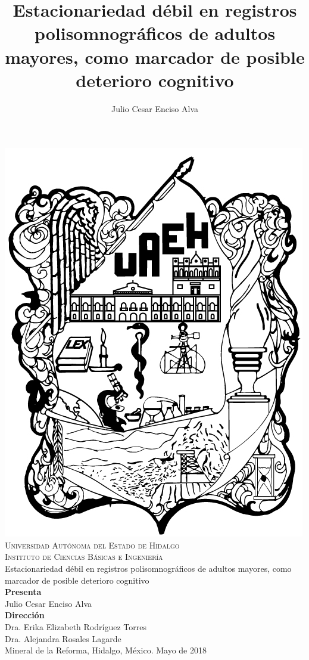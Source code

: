 \documentclass[12pt,letterpaper]{book}
\begin{document}
\setcounter{page}{0}
\thispagestyle{empty}

\title{Estacionariedad débil en registros polisomnográficos de adultos mayores,
como marcador de posible deterioro cognitivo}
\author{Julio Cesar Enciso Alva}

\begin{center}
    \includegraphics[width=0.2\linewidth]{./img_oficiales/logo_uaeh.png}\\
    
    {\large 
        \textsc{
            Universidad Autónoma del Estado de Hidalgo\\
            Instituto de Ciencias Básicas e Ingeniería\\
        }
    }
\vspace*{2.5em}
    {\huge
        Estacionariedad débil en registros polisomnográficos de adultos mayores,
        como marcador de posible deterioro cognitivo\\
    }
\vspace*{2.5em}
    {\large
        \textbf{Presenta}\\
    }
\vspace*{.25em}
    {\Large
        Julio Cesar Enciso Alva\\
    }
\vspace*{3em}
    {\large
        \textbf{Dirección}\\
    }
\vspace*{.25em}
    {\Large
        Dra. Erika Elizabeth Rodríguez Torres\\
        Dra. Alejandra Rosales Lagarde\\
    }
\vspace*{3em}
    {\large
        Mineral de la Reforma, Hidalgo, México. Mayo de 2018
    }
\end{center}

\newpage

\end{document}
